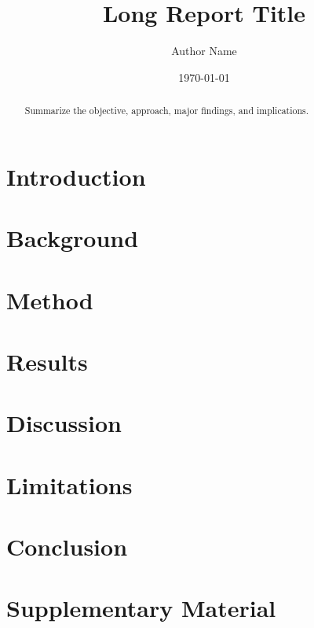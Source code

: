 \documentclass[fontsize=11pt,paper=letter,parskip=half]{scrreprt}
\title{Long Report Title}
\author{Author Name}
\date{\today}
\begin{document}
\maketitle
\begin{abstract}
Summarize the objective, approach, major findings, and implications.
\end{abstract}
\tableofcontents
\listoffigures
\listoftables

\chapter{Introduction}
\chapter{Background}
\chapter{Method}
\chapter{Results}
\chapter{Discussion}
\chapter{Limitations}
\chapter{Conclusion}

\appendix
\chapter{Supplementary Material}

% 
% 
\end{document}
